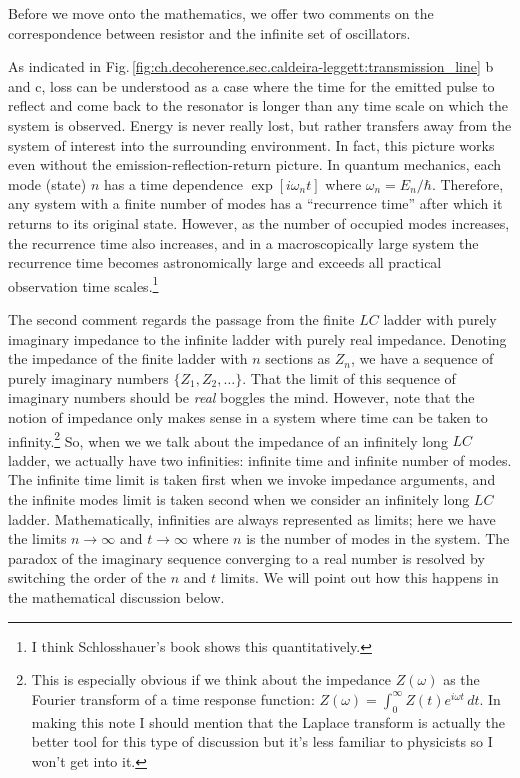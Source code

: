 Before we move onto the mathematics, we offer two comments on the correspondence between resistor and the infinite set of oscillators.

As indicated in Fig.\,\ref{fig:ch.decoherence.sec.caldeira-leggett:transmission_line} b and c, loss can be understood as a case where the time for the emitted pulse to reflect and come back to the resonator is longer than any time scale on which the system is observed.
Energy is never really lost, but rather transfers away from the system of interest into the surrounding environment.
In fact, this picture works even without the emission-reflection-return picture.
In quantum mechanics, each mode (state) $n$ has a time dependence $\exp [ i \omega_n t]$ where $\omega_n = E_n/\hbar$.
Therefore, any system with a finite number of modes has a ``recurrence time'' after which it returns to its original state.
However, as the number of occupied modes increases, the recurrence time also increases, and in a macroscopically large system the recurrence time becomes astronomically large and exceeds all practical observation time scales.\footnote{I think Schlosshauer's book shows this quantitatively.}

The second comment regards the passage from the finite $LC$ ladder with purely imaginary impedance to the infinite ladder with purely real impedance.
Denoting the impedance of the finite ladder with $n$ sections as $Z_n$, we have a sequence of purely imaginary numbers $\{ Z_1, Z_2, \ldots \}$.
That the limit of this sequence of imaginary numbers should be \emph{real} boggles the mind.
However, note that the notion of impedance only makes sense in a system where time can be taken to infinity.\footnote{This is especially obvious if we think about the impedance $Z(\omega)$ as the Fourier transform of a time response function: $Z(\omega) = \int_0^\infty Z(t) e^{i \omega t} \, dt$. In making this note I should mention that the Laplace transform is actually the better tool for this type of discussion but it's less familiar to physicists so I won't get into it.}
So, when we we talk about the impedance of an infinitely long $LC$ ladder, we actually have two infinities: infinite time and infinite number of modes.
The infinite time limit is taken first when we invoke impedance arguments, and the infinite modes limit is taken second when we consider an infinitely long $LC$ ladder.
Mathematically, infinities are always represented as limits; here we have the limits $n\rightarrow \infty$ and $t \rightarrow \infty$ where $n$ is the number of modes in the system.
The paradox of the imaginary sequence converging to a real number is resolved by switching the order of the $n$ and $t$ limits.
We will point out how this happens in the mathematical discussion below.

